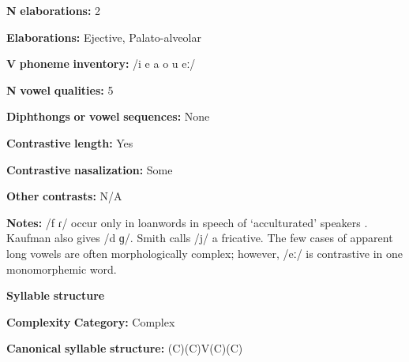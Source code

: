 \begin{styleBody}
\textbf{N} \textbf{elaborations:} 2
\end{styleBody}

\begin{styleBody}
\textbf{Elaborations:} Ejective, Palato-alveolar
\end{styleBody}

\begin{styleBody}
\textbf{V} \textbf{phoneme} \textbf{inventory:} /i e a o u eː/
\end{styleBody}

\begin{styleBody}
\textbf{N} \textbf{vowel} \textbf{qualities:} 5
\end{styleBody}

\begin{styleBody}
\textbf{Diphthongs} \textbf{or} \textbf{vowel} \textbf{sequences:} None
\end{styleBody}

\begin{styleBody}
\textbf{Contrastive} \textbf{length:} Yes
\end{styleBody}

\begin{styleBody}
\textbf{Contrastive} \textbf{nasalization:} Some
\end{styleBody}

\begin{styleBody}
\textbf{Other} \textbf{contrasts:} N/A
\end{styleBody}

\begin{styleBody}
\textbf{Notes:} /f ɾ/ occur only in loanwords in speech of ‘acculturated’ speakers \citep[13]{Kaufman1971}. Kaufman also gives /d ɡ/. Smith calls /j/ a fricative. The few cases of apparent long vowels are often morphologically complex; however, /eː/ is contrastive in one monomorphemic word.
\end{styleBody}

\begin{styleBody}
\textbf{Syllable} \textbf{structure}
\end{styleBody}

\begin{styleBody}
\textbf{Complexity} \textbf{Category:} Complex
\end{styleBody}

\begin{styleBody}
\textbf{Canonical} \textbf{syllable} \textbf{structure:} (C)(C)V(C)(C) \citep[9-15]{Kaufman1971}
\end{styleBody}

